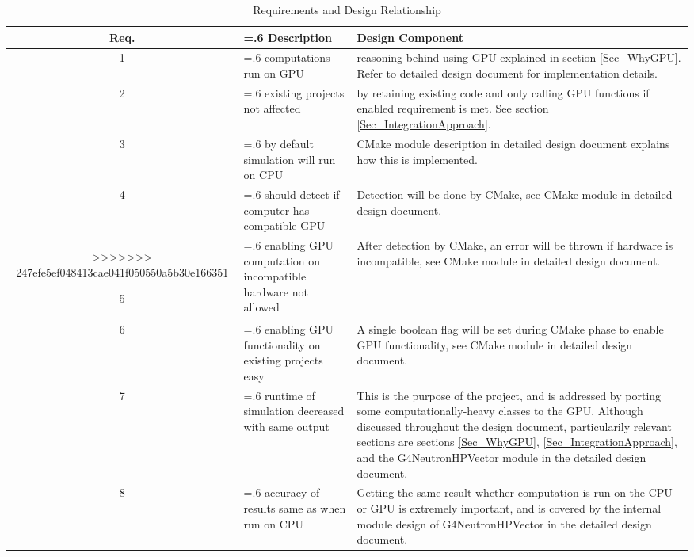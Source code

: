 \documentclass[12pt]{article}
\begin{document}
\begin{table}[h]
\centering
\caption{Requirements and Design Relationship}\label{Table_RequirementsAndDesign}

\begin{tabularx}{\textwidth}{c>{\hsize=.6\hsize}X>{\hsize=1.4\hsize}X}
\toprule
\bf Req. & \bf Description & \bf Design Component\\\midrule
\arrayrulecolor{lightgray}
1  & computations run on GPU & reasoning behind using GPU explained in section \ref{Sec_WhyGPU}. Refer to detailed design document for implementation details.\\\hline

2  & existing projects not affected & by retaining existing code and only calling GPU functions if enabled requirement is met. See section \ref{Sec_IntegrationApproach}.\\\hline

3  & by default simulation will run on CPU & CMake module description in detailed design document explains how this is implemented.\\\hline

4  & should detect if computer has compatible GPU & Detection will be done by CMake, see CMake module in detailed design document.\\\hline
>>>>>>> 247efe5ef048413cae041f050550a5b30e166351

5  & enabling GPU computation on incompatible hardware not allowed & After detection by CMake, an error will be thrown if hardware is incompatible, see CMake module in detailed design document.\\\hline

6  & enabling GPU functionality on existing projects easy & A single boolean flag will be set during CMake phase to enable GPU functionality, see CMake module in detailed design document.\\\hline

7 & runtime of simulation decreased with same output & This is the purpose of the project, and is addressed by porting some computationally-heavy classes to the GPU. Although discussed throughout the design document, particularily relevant sections are sections \ref{Sec_WhyGPU}, \ref{Sec_IntegrationApproach}, and the G4NeutronHPVector module in the detailed design document.\\\hline

8 & accuracy of results same as when run on CPU & Getting the same result whether computation is run on the CPU or GPU is extremely important, and is covered by the internal module design of G4NeutronHPVector in the detailed design document.\\\hline


\end{tabularx}
\end{table}
\end{document}
